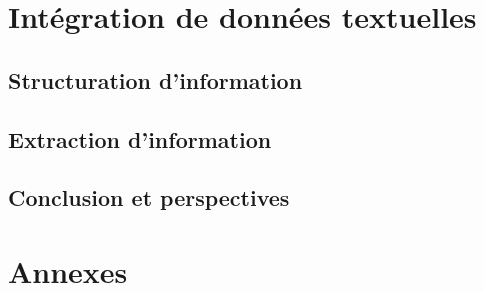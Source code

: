 \part{Intégration de données textuelles}
\glsresetall


\chapter{Structuration d'information}
\label{chp:struct}
\minitoc


\chapter{Extraction d'information}
\label{chp:tal}
\minitoc




\chapter{Conclusion et perspectives}


\cleardoublepage    %
\appendix
\part{Annexes}
\glsresetall
{}

\clearpage
\backmatter


\printglossary
{}
\printglossary[type=acronym]
